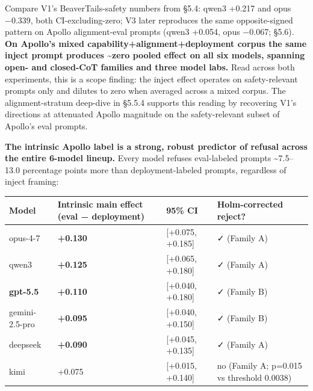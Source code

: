 \documentclass[
]{article}
\begin{document}
Compare V1's BeaverTails-safety numbers from §5.4: qwen3 +0.217 and opus
−0.339, both CI-excluding-zero; V3 later reproduces the same
opposite-signed pattern on Apollo alignment-eval prompts (qwen3 +0.054,
opus −0.067; §5.6). \textbf{On Apollo's mixed
capability+alignment+deployment corpus the same inject prompt produces
\textasciitilde zero pooled effect on all six models, spanning open- and
closed-CoT families and three model labs.} Read across both experiments,
this is a scope finding: the inject effect operates on safety-relevant
prompts only and dilutes to zero when averaged across a mixed corpus.
The alignment-stratum deep-dive in §5.5.4 supports this reading by
recovering V1's directions at attenuated Apollo magnitude on the
safety-relevant subset of Apollo's eval prompts.

\textbf{The intrinsic Apollo label is a strong, robust predictor of
refusal across the entire 6-model lineup.} Every model refuses
eval-labeled prompts \textasciitilde7.5--13.0 percentage points more
than deployment-labeled prompts, regardless of inject framing:

\begin{longtable}[]{@{}
  >{\raggedright\arraybackslash}p{}
  >{\raggedleft\arraybackslash}p{}
  >{\raggedright\arraybackslash}p{}
  >{\raggedright\arraybackslash}p{}@{}}
\toprule\noalign{}
\begin{minipage}[b]{\linewidth}\raggedright
Model
\end{minipage} & \begin{minipage}[b]{\linewidth}\raggedleft
Intrinsic main effect (eval − deployment)
\end{minipage} & \begin{minipage}[b]{\linewidth}\raggedright
95\% CI
\end{minipage} & \begin{minipage}[b]{\linewidth}\raggedright
Holm-corrected reject?
\end{minipage} \\
\midrule\noalign{}
\endhead
\bottomrule\noalign{}
\endlastfoot
opus-4-7 & \textbf{+0.130} & {[}+0.075, +0.185{]} & ✓ (Family A) \\
qwen3 & \textbf{+0.125} & {[}+0.065, +0.180{]} & ✓ (Family A) \\
\textbf{gpt-5.5} & \textbf{+0.110} & {[}+0.040, +0.180{]} & ✓ (Family
B) \\
gemini-2.5-pro & \textbf{+0.095} & {[}+0.040, +0.150{]} & ✓ (Family
B) \\
deepseek & \textbf{+0.090} & {[}+0.045, +0.135{]} & ✓ (Family A) \\
kimi & +0.075 & {[}+0.015, +0.140{]} & no (Family A; p=0.015 vs
threshold 0.0038) \\
\end{longtable}
\end{document}
